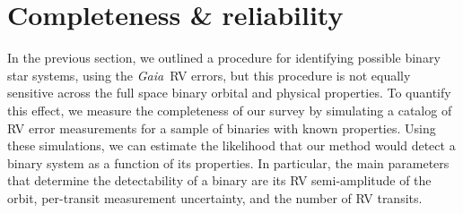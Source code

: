 \documentclass[modern, letterpaper]{aastex631}
\newcommand{\project}[1]{\textsl{#1}}
\newcommand{\Gaia}{\project{Gaia}}
\begin{document}









\section{Completeness \& reliability}

In the previous section, we outlined a procedure for identifying possible binary star systems, using the \Gaia\ RV errors, but this procedure is not equally sensitive across the full space binary orbital and physical properties.
To quantify this effect, we measure the completeness of our survey by simulating a catalog of RV error measurements for a sample of binaries with known properties.
Using these simulations, we can estimate the likelihood that our method would detect a binary system as a function of its properties.
In particular, the main parameters that determine the detectability of a binary are its RV semi-amplitude of the orbit, per-transit measurement uncertainty, and the number of RV transits.
\end{document}
